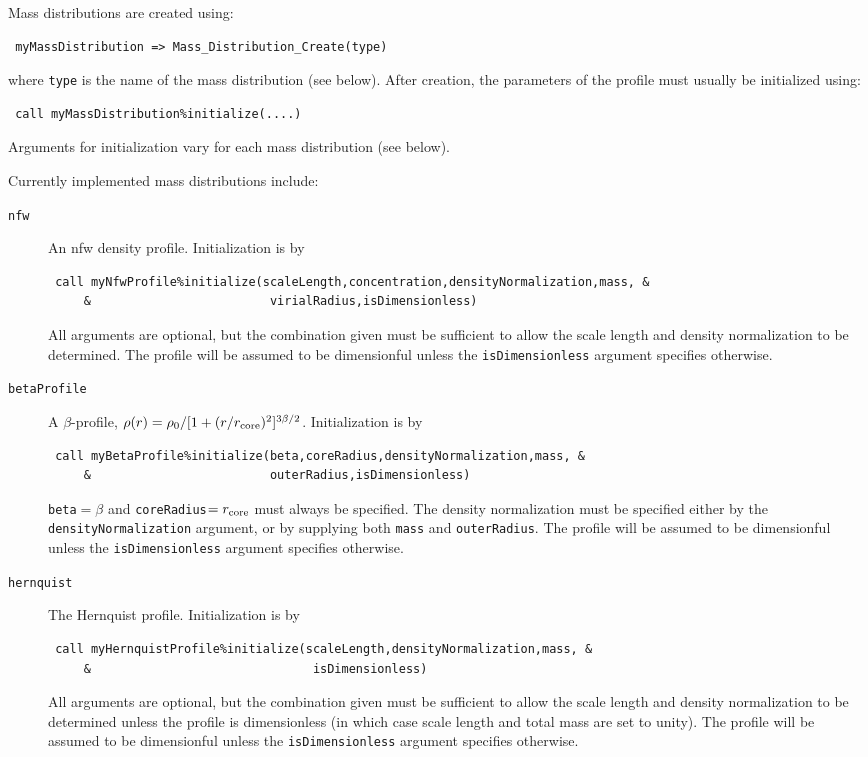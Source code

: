 Mass distributions are created using:
\begin{verbatim}
 myMassDistribution => Mass_Distribution_Create(type)
\end{verbatim}
where {\tt type} is the name of the mass distribution (see below). After creation, the parameters of the profile must usually be initialized using:
\begin{verbatim}
 call myMassDistribution%initialize(....)
\end{verbatim}
Arguments for initialization vary for each mass distribution (see below).

Currently implemented mass distributions include:
\begin{description}
 \item [{\tt nfw}] An \gls{nfw} \citep{navarro_universal_1997} density profile. Initialization is by
\begin{verbatim}
 call myNfwProfile%initialize(scaleLength,concentration,densityNormalization,mass, &
     &                         virialRadius,isDimensionless)
\end{verbatim}
All arguments are optional, but the combination given must be sufficient to allow the scale length and density normalization to be determined. The profile will be assumed to be dimensionful unless the {\tt isDimensionless} argument specifies otherwise.
 \item [{\tt betaProfile}] A $\beta$-profile, $\rho(r)=\rho_0/[1+(r/r_{\rm core})^2]^{3\beta/2}$. Initialization is by
\begin{verbatim}
 call myBetaProfile%initialize(beta,coreRadius,densityNormalization,mass, &
     &                         outerRadius,isDimensionless)
\end{verbatim}
 {\tt beta}$=\beta$ and {\tt coreRadius}$=r_{\rm core}$ must always be specified. The density normalization must be specified either by the {\tt densityNormalization} argument, or by supplying both {\tt mass} and {\tt outerRadius}. The profile will be assumed to be dimensionful unless the {\tt isDimensionless} argument specifies otherwise.
 \item [{\tt hernquist}] The Hernquist \citep{hernquist_analytical_1990} profile. Initialization is by
\begin{verbatim}
 call myHernquistProfile%initialize(scaleLength,densityNormalization,mass, &
     &                               isDimensionless)
\end{verbatim}
All arguments are optional, but the combination given must be sufficient to allow the scale length and density normalization to be determined unless the profile is dimensionless (in which case scale length and total mass are set to unity). The profile will be assumed to be dimensionful unless the {\tt isDimensionless} argument specifies otherwise.

\end{description}
